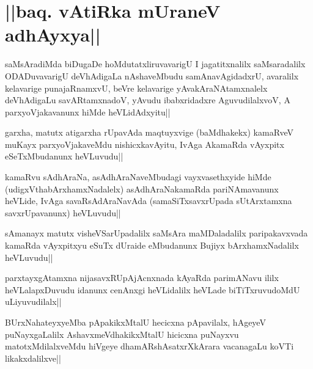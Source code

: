 \section*{||baq. vAtiRka mUraneV adhAyxya||}


\begin{artha}
saMsAradiMda biDugaDe hoMdutatxliruvavarigU I jagatitxnalilx saMsaradalilx ODADuvavarigU deVhAdigaLa nAshaveMbudu samAnavAgidadxrU, avaralilx kelavarige punajaRnamxvU, beVre kelavarige yAvakAraNAtamxnalelx deVhAdigaLu savARtamxnadoV, yAvudu ibabxridadxre AguvudilalxvoV, A parxyoVjakavanunx hiMde heVLidAdxyitu||
\end{artha}


\begin{artha}
garxha, matutx atigarxha rUpavAda maqtuyxvige (baMdhakekx) kamaRveV muKayx parxyoVjakaveMdu nishicxkavAyitu, IvAga AkamaRda vAyxpitx eSeTxMbudanunx heVLuvudu||
\end{artha}

\begin{artha}
kamaRvu sAdhAraNa, asAdhAraNaveMbudagi vayxvasethxyide hiMde (udigxVthabArxhamxNadalelx) asAdhAraNakamaRda pariNAmavanunx heVLide, IvAga savaRsAdAraNavAda (samaSiTxsavxrUpada sUtArxtamxna savxrUpavanunx) heVLuvudu||
\end{artha}


\begin{artha}
sAmanayx matutx visheVSarUpadalilx saMsAra maMDaladalilx paripakavxvada kamaRda vAyxpitxyu eSuTx dUraide eMbudanunx Bujiyx bArxhamxNadalilx heVLuvudu||
\end{artha}

\begin{artha}
parxtayxgAtamxna nijasavxRUpAjAcnxnada kAyaRda parimANavu ililx heVLalapxDuvudu idanunx cenAnxgi heVLidalilx heVLade biTiTxruvudoMdU uLiyuvudilalx||
\end{artha}


\begin{artha}
BUrxNahateyxyeMba pApakikxMtalU hecicxna pApavilalx, hAgeyeV puNayxgaLalilx AshavxmeVdhakikxMtalU hicicxna puNayxvu matotxMdilalxveMdu hiVgeye dhamARshAsatxrXkArara vacanagaLu koVTi likakxdalilxve||
\end{artha}

